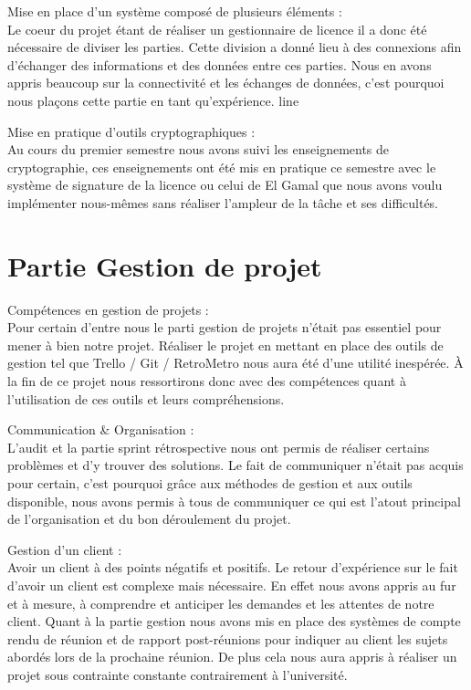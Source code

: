      Mise en place d'un système composé de plusieurs éléments :\\
     \newline
     Le coeur du projet étant de réaliser un gestionnaire de licence il a donc été nécessaire de diviser les parties. 
     Cette division a donné lieu à des connexions afin d'échanger des informations et des données entre ces parties. 
     Nous en avons appris beaucoup sur la connectivité et les échanges de données, c'est pourquoi nous plaçons cette partie en tant  qu'expérience.
     \new line
    
     Mise en pratique d'outils cryptographiques :\\
     \newline
     Au cours du premier semestre nous avons suivi les enseignements de cryptographie, ces enseignements ont été mis en pratique ce semestre avec le système de signature de la licence ou celui de 
     El Gamal que nous avons voulu implémenter nous-mêmes sans réaliser l'ampleur de la tâche et ses difficultés.
     \newline
     \newpage
\section{Partie Gestion de projet}
    Compétences en gestion de projets : \\
    \newline
    Pour certain d'entre nous le parti gestion de projets n'était pas essentiel pour mener à bien notre projet. Réaliser le projet en 
    mettant en place des outils de gestion tel que Trello / Git / RetroMetro nous aura été d'une utilité inespérée. 
    À la fin de ce projet nous ressortirons donc avec des compétences quant à l'utilisation de ces outils et leurs compréhensions.
    \newline

    Communication \& Organisation : \\
    \newline
    L'audit et la partie sprint rétrospective nous ont permis de réaliser certains problèmes et d'y trouver des solutions. Le fait de communiquer 
    n'était pas acquis pour certain, c'est pourquoi grâce aux méthodes de gestion et aux outils disponible, nous avons permis à tous de communiquer 
    ce qui est l'atout principal de l'organisation et du bon déroulement du projet.
    \newline

    Gestion d'un client :\\
    \newline
    Avoir un client à des points négatifs et positifs. Le retour d'expérience sur le fait d'avoir un client est complexe mais nécessaire. En effet nous avons appris au fur et 
    à mesure, à comprendre et anticiper les demandes et les attentes de notre client. Quant à la partie gestion nous avons mis en place des systèmes de compte rendu de réunion et de rapport post-réunions pour indiquer au client les sujets abordés lors 
    de la prochaine réunion. De plus cela nous aura appris à réaliser un projet sous contrainte constante contrairement à l'université.

